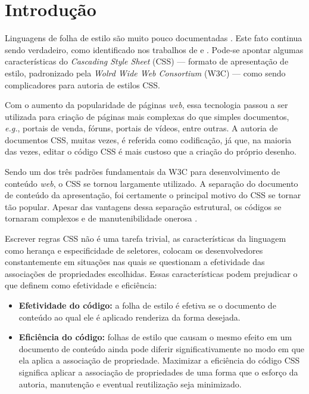 %
%

\chapter{Introdução}\label{chap:introducao}
\label{chap:intro}

Linguagens de folha de estilo são muito pouco documentadas \cite{Marden1999}. Este fato continua sendo verdadeiro, como identificado nos trabalhos de  e . Pode-se apontar algumas características do \textit{Cascading Style Sheet} (CSS) --- formato de apresentação de estilo, padronizado pela \textit{Wolrd Wide Web Consortium} (W3C) --- como sendo complicadores para autoria de estilos CSS.

Com o aumento da popularidade de páginas \textit{web}, essa tecnologia passou a ser utilizada para criação de páginas mais complexas do que simples documentos, \textit{e.g.}, portais de venda, fóruns, portais de vídeos, entre outras. A autoria de documentos CSS, muitas vezes, é referida como codificação, já que, na maioria das vezes, editar o código CSS é mais custoso que a criação do próprio desenho.

Sendo um dos três padrões fundamentais da W3C para desenvolvimento de conteúdo \textit{web}, o CSS se tornou largamente utilizado. A separação do documento de conteúdo da apresentação, foi certamente o principal motivo do CSS se tornar tão popular. Apesar das vantagens dessa separação estrutural, os códigos se tornaram complexos e de manutenibilidade onerosa \cite{Mesbah2012}.

Escrever regras CSS não é uma tarefa trivial, as características da linguagem como herança e especificidade de seletores, colocam os desenvolvedores constantemente em situações nas quais se questionam a efetividade das associações de propriedades escolhidas. Essas características podem prejudicar o que  definem como efetividade e eficiência:

\begin{itemize}
	\item\textbf{Efetividade do código:} a folha de estilo é efetiva se o documento de conteúdo ao qual ele é aplicado renderiza da forma desejada.
	
	\item\textbf{Eficiência do código:} folhas de estilo que causam o mesmo efeito em um documento de conteúdo ainda pode diferir significativamente no modo em que ela aplica a associação de propriedade. Maximizar a eficiência do código CSS significa aplicar a associação de propriedades de uma forma que o esforço da autoria, manutenção e eventual reutilização seja minimizado.
\end{itemize}

